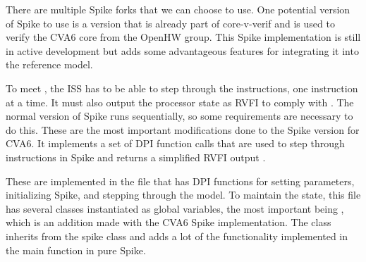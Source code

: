 There are multiple Spike forks that we can choose to use. One potential version of Spike to use is a version that is already part of core-v-verif and is used to verify the CVA6 core from the OpenHW group. This Spike implementation is still in active development but adds some advantageous features for integrating it into the reference model.

To meet , the ISS has to be able to step through the instructions, one instruction at a time. It must also output the processor state as RVFI to comply with . The normal version of Spike runs sequentially, so some requirements are necessary to do this. These are the most important modifications done to the Spike version for CVA6. It implements a set of DPI function calls that are used to step through instructions in Spike and returns a simplified RVFI output \cite{openhwgroupOpenhwgroupCorevverif2023}.

These are implemented in the  file that has DPI functions for setting parameters, initializing Spike, and stepping through the model. To maintain the state, this file has several classes instantiated as global variables, the most important being , which is an addition made with the CVA6 Spike implementation. The  class inherits from the spike  class and adds a lot of the functionality implemented in the main function in pure Spike.  



